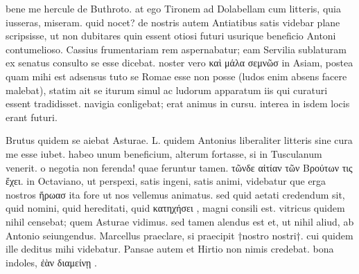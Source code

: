 


 bene me hercule de Buthroto. at ego Tironem ad Dolabellam cum litteris, quia iusseras, miseram. quid nocet? de nostris autem Antiatibus satis videbar plane scripsisse, ut non dubitares quin essent otiosi futuri usurique beneficio Antoni contumelioso. Cassius frumentariam rem aspernabatur; eam Servilia sublaturam ex senatus consulto se esse dicebat. noster vero καὶ μάλα σεμνῶσ in Asiam, postea quam mihi est adsensus tuto se Romae esse non posse (ludos enim absens facere malebat), statim ait se iturum simul ac ludorum apparatum iis qui curaturi essent tradidisset. navigia conligebat; erat animus in cursu. interea in isdem locis erant futuri.

 Brutus quidem se aiebat Asturae. L. quidem Antonius liberaliter litteris sine cura me esse iubet. habeo unum beneficium, alterum fortasse, si in Tusculanum venerit. o negotia non ferenda! quae feruntur tamen. τῶνδε αἰτίαν τῶν Βρούτων τις ἔχει. in Octaviano, ut perspexi, satis ingeni, satis animi, videbatur que erga nostros ἥρωασ ita fore ut nos vellemus animatus. sed quid aetati credendum sit, quid nomini, quid hereditati, quid κατηχήσει , magni consili est. vitricus quidem nihil censebat; quem Asturae vidimus. sed tamen alendus est et, ut nihil aliud, ab Antonio seiungendus. Marcellus praeclare, si praecipit †nostro nostri†. cui quidem ille deditus mihi videbatur. Pansae autem et Hirtio non nimis credebat. bona indoles, ἐὰν διαμείνῃ .
